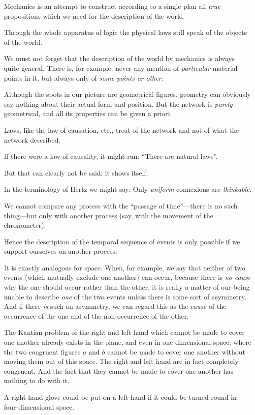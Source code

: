{Mechanics is an attempt to construct according
to a single plan all \emph{true} propositions which we
need for the description of the world.}


{Through the whole apparatus of logic the
physical laws still speak of the objects of the
world.}


{We must not forget that the description of the
world by mechanics is always quite general.
There is, for example, never any mention of
\emph{particular} material points in it, but always only
of \emph{some points or other}.}


{Although the spots in our picture are geometrical
figures, geometry can obviously say nothing
about their actual form and position. But the
network is \emph{purely} geometrical, and all its properties
can be given a priori.

Laws, like the law of causation, etc., treat
of the network and not of what the network
described.}


{If there were a law of causality, it might run:
``There are natural laws''.

But that can clearly not be said: it shows
itself.}


{In the terminology of Hertz we might say:
Only \emph{uniform} connexions are \emph{thinkable}.}


{We cannot compare any process with the
``passage of time''---there is no such thing---but
only with another process (say, with the movement
of the chronometer).

Hence the description of the temporal sequence
of events is only possible if we support ourselves
on another process.

It is exactly analogous for space. When, for
example, we say that neither of two events (which
mutually exclude one another) can occur, because
there is \emph{no cause} why the one should occur rather
than the other, it is really a matter of our being
unable to describe \emph{one} of the two events unless
there is some sort of asymmetry. And if there \emph{is}
such an asymmetry, we can regard this as the
\emph{cause} of the occurrence of the one and of the non-occurrence
of the other.}


{The Kantian problem of the right and left hand
which cannot be made to cover one another already
exists in the plane, and even in one-di\-men\-sio\-nal
space; where the two congruent figures $a$ and $b$
cannot be made to cover one another without
moving them out of this space. The right and
left hand are in fact completely congruent. And
the fact that they cannot be made to cover one
another has nothing to do with it.

A right-hand glove could be put on a left hand
if it could be turned round in four-dimensional
space.}


